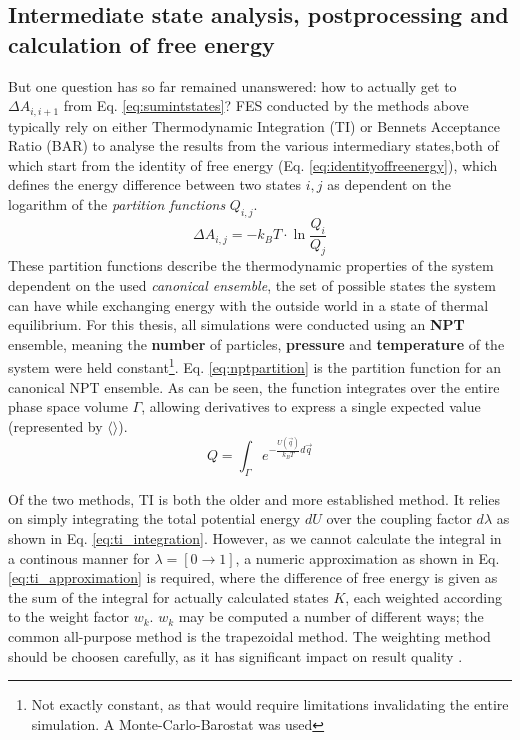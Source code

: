 \documentclass[oneside]{scrreprt}
\begin{document}
\subsection{Intermediate state analysis, postprocessing and calculation of free energy}

But one question has so far remained unanswered: how to actually get to $\Delta A_{i,i+1}$ from Eq. \ref{eq:sumintstates}? 
FES conducted by the methods above typically rely on either Thermodynamic Integration (TI) \cite{straatsma_free_1986} or Bennets Acceptance Ratio (BAR) \cite{Bennett1976Oct,shirts_statistically_2008} to analyse the results from the various intermediary states,both of which start from the identity of free energy (Eq. \ref{eq:identityoffreenergy}), which defines the energy difference between two states $i,j$ as dependent on the logarithm of the \emph{partition functions} $Q_{i,j}$.
\begin{equation} \label{eq:identityoffreenergy}
    \Delta A_{i,j}=-k_{B}T\cdot \ln\frac{Q_i}{Q_j}
\end{equation}
These partition functions describe the thermodynamic properties of the system dependent on the used \emph{canonical ensemble}, the set of possible states the system can have while exchanging energy with the outside world in a state of thermal equilibrium. For this thesis, all simulations were conducted using an \textbf{NPT} ensemble, meaning the \textbf{number} of particles, \textbf{pressure} and \textbf{temperature} of the system were held constant\footnote{Not exactly constant, as that would require limitations invalidating the entire simulation. A Monte-Carlo-Barostat was used}. Eq. \ref{eq:nptpartition} is the partition function for an canonical NPT ensemble. As can be seen, the function integrates over the entire phase space volume $\Gamma$, allowing derivatives to express a single expected value (represented by $\langle \rangle$).
\begin{equation} \label{eq:nptpartition}
    Q=\int_\Gamma e^{-\frac{U(\Vec{q})}{k_B T}d\Vec{q}}
\end{equation}

Of the two methods, TI is both the older and more established method. It relies on simply integrating the total potential energy $dU$ over the coupling factor $d\lambda$ as shown in Eq. \ref{eq:ti_integration}. However, as we cannot calculate the integral in a continous manner for $\lambda =[0\rightarrow1]$, a numeric approximation as shown in Eq. \ref{eq:ti_approximation} is required, where the difference of free energy is given as the sum of the integral for actually calculated states $K$, each weighted according to the weight factor $w_k$. $w_k$ may be computed a number of different ways; the common all-purpose method is the trapezoidal method. The weighting method should be choosen carefully, as it has significant impact on result quality \cite{boresch_efficiency_2011}.
\end{document}

